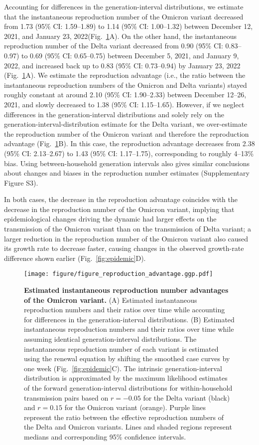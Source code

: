 \documentclass[12pt]{article}
\newcommand{\fref}[1]{Fig.~\ref{fig:#1}}
\begin{document}
Accounting for differences in the generation-interval distributions, we estimate that the instantaneous reproduction number of the Omicron variant decreased from 1.73 (95\% CI: 1.59--1.89) to 1.14 (95\% CI: 1.00--1.32) between December 12, 2021, and January 23, 2022(\fref{reproduction}A).
On the other hand, the instantaneous reproduction number of the Delta variant decreased from 0.90 (95\% CI: 0.83--0.97) to 0.69 (95\% CI: 0.65--0.75) between December 5, 2021, and January 9, 2022, and increased back up to 0.83 (95\% CI: 0.73--0.94) by January 23, 2022 (\fref{reproduction}A).
We estimate the reproduction advantage (i.e., the ratio between the instantaneous reproduction numbers of the Omicron and Delta variants) stayed roughly constant at around 2.10 (95\% CI: 1.90--2.33) between December 12--26, 2021, and slowly decreased to 1.38 (95\% CI: 1.15--1.65).
However, if we neglect differences in the generation-interval distributions and solely rely on the generation-interval-distribution estimate for the Delta variant, we over-estimate the reproduction number of the Omicron variant and therefore the reproduction advantage (\fref{reproduction}B).
In this case, the reproduction advantage decreases from 2.38 (95\% CI: 2.13--2.67) to 1.43 (95\% CI: 1.17--1.75), corresponding to roughly 4--13\% bias.
Using between-household generation intervals also gives similar conclusions about changes and biases in the reproduction number estimates (Supplementary Figure S3).

In both cases, the decrease in the reproduction advantage coincides with the decrease in the reproduction number of the Omicron variant, implying that epidemiological changes driving the dynamic had larger effects on the transmission of the Omicron variant than on the transmission of Delta variant;
a larger reduction in the reproduction number of the Omicron variant also caused its growth rate to decrease faster, causing changes in the observed growth-rate difference shown earlier (\fref{epidemic}D).

\begin{figure}[!th]
\texttt{[image: figure/figure\_reproduction\_advantage.ggp.pdf]}
\caption{
\textbf{Estimated instantaneous reproduction number advantages of the Omicron variant.}
(A) Estimated instantaneous reproduction numbers and their ratios over time while accounting for differences in the generation-interval distributions.
(B) Estimated instantaneous reproduction numbers and their ratios over time while assuming identical generation-interval distributions.
The instantaneous reproduction number of each variant is estimated using the renewal equation by shifting the smoothed case curves by one week (\fref{epidemic}C).
The intrinsic generation-interval distribution is approximated by the maximum likelihood estimates of the forward generation-interval distributions for within-household transmission pairs based on $r=-0.05$ for the Delta variant (black) and $r=0.15$ for the Omicron variant (orange).
Purple lines represent the ratio between the effective reproduction numbers of the Delta and Omicron variants.
Lines and shaded regions represent medians and corresponding 95\% confidence intervals.
\label{fig:reproduction}
}
\end{figure}
\end{document}
